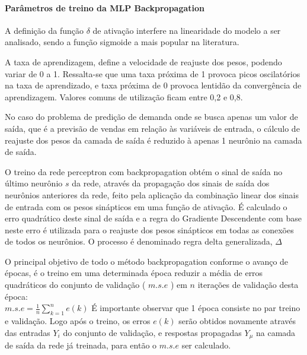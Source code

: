             \paragraph*{Parâmetros de treino da MLP Backpropagation}
            A definição da função $\delta$ de ativação interfere na linearidade  do modelo a ser analisado, sendo a função sigmoide a mais popular na literatura. 
            
            A taxa de aprendizagem, define a velocidade de reajuste dos pesos, podendo variar de 0 a 1. Ressalta-se que uma taxa próxima de 1 provoca picos oscilatórios na taxa de aprendizado, e taxa próxima de 0 provoca lentidão da convergência de aprendizagem. Valores comuns de utilização ficam entre 0,2 e 0,8.
        
            No caso do problema de predição de demanda onde se busca apenas um valor de saída, que é a previsão de vendas em relação às variáveis de entrada, o cálculo de reajuste dos pesos da camada de saída é reduzido à apenas 1 neurônio na camada de saída.
            
            O treino da rede perceptron com backpropagation obtém o sinal de saída no último neurônio $s$ da rede, através da propagação dos sinais de saída dos neurônios anteriores da rede, feito pela aplicação da combinação linear dos sinais de entrada com os pesos sinápticos em uma função de ativação. É calculado o erro quadrático deste sinal de saída e a regra do Gradiente Descendente com base neste erro é utilizada para o reajuste dos pesos sinápticos em todas as conexões de todos os neurônios. O processo é denominado regra delta generalizada, $\Delta$
            
            O principal objetivo de todo o método backpropagation conforme o avanço de épocas, é o treino em uma determinada época reduzir a média de erros quadráticos do conjunto de validação ( $m.s.e$ ) em $n$ iterações de validação desta época:\\
            $m.s.e = \frac{1}{n} \sum_{k=1}^{n}e(k)$
            É importante observar que 1 época consiste no par treino e validação. Logo após o treino, os erros $e(k)$ serão obtidos novamente através das entradas $Y_i$ do conjunto de validação, e respostas propagadas $Y_\mu$ na camada de saída da rede já treinada, para então o $m.s.e$ ser calculado.
            
